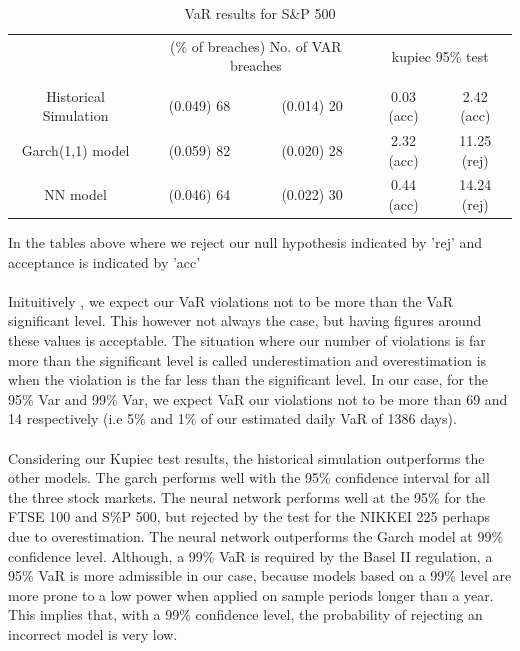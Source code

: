 \documentclass[a4paper,11pt,oneside]{book}
\begin{document}
\begin{table}[h]
	\caption {VaR results for S\&P 500}
	\centering\setlength{\extrarowheight}{2pt}
	\centering
	\begin{tabular}{|*{5}{c|}}
		\hline
		\multirowcell{3}{model} & 
		
		\multicolumn{2}{c|}{(\% of breaches) No. of VAR breaches} &
		\multicolumn{2}{c|}{kupiec 95\% test} \\
		\cline{2-5}
		& \makecell{95\%} & \makecell{99\%} & \makecell{95\%} & \makecell{99\%} \\
		\hline
		Historical Simulation  & (0.049)  68  & (0.014) 20  & 0.03 (acc)  & 2.42 (acc)\\ 
		\hline
		Garch(1,1) model & (0.059) 82   & (0.020)  28 & 2.32 (acc)  & 11.25 (rej) \\
		\hline
		NN model  & (0.046)  64  & (0.022) 30  & 0.44 (acc)  &14.24 (rej)  \\
		\hline
	\end{tabular}
\end{table}


In the tables above where we reject our null hypothesis indicated by 'rej' and acceptance is indicated by 'acc'\\\\

Inituitively , we expect our VaR violations not to be more than the VaR significant level. This however not always the case, but having figures around these values is acceptable. The situation where our number of violations is far more than the significant level is called underestimation and overestimation is when the violation is the far less than the significant level.  In our case, for the 95\% Var and 99\% Var, we expect VaR our violations not to be more than 69 and 14 respectively (i.e 5\% and 1\% of our estimated daily VaR of 1386 days). \\\\

Considering our Kupiec test results, the historical simulation outperforms the other models. The garch performs well with the 95\% confidence interval for all the three stock markets. The neural network performs well at the 95\% for the FTSE 100 and S\%P 500, but rejected by the test for the NIKKEI 225 perhaps due to overestimation. The neural network outperforms the Garch model at 99\% confidence level. Although, a 99\% VaR
is required by the Basel II regulation, a 95\% VaR is more admissible in our case,
because models based on a 99\% level are more prone to a low power when
applied on sample periods longer than a year. This implies that, with a 99\%
confidence level, the probability of rejecting an incorrect model is very low.
\end{document}
